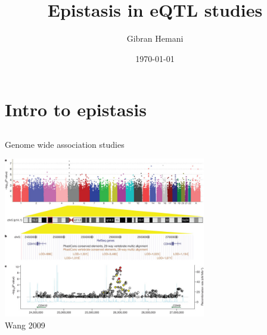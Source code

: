 \documentclass{beamer}
\title[Epistasis and eQTL]{Epistasis in eQTL studies}
\author{Gibran Hemani}
\date{\today}
\begin{document}

\begin{frame}
\titlepage
\end{frame}

\section{Intro to epistasis}
\subsection{}




\begin{frame}{Genome wide association studies}
	\begin{center}
		\includegraphics[height=7cm]{gwas.jpg} \\
		{\tiny Wang 2009}
	\end{center}
\end{frame}
\end{document}
